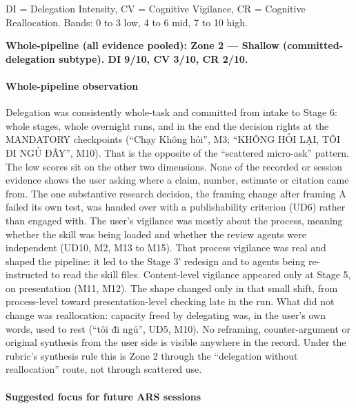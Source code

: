 \documentclass[12pt,a4paper]{article}
\begin{document}
DI = Delegation Intensity, CV = Cognitive Vigilance, CR = Cognitive
Reallocation. Bands: 0 to 3 low, 4 to 6 mid, 7 to 10 high.

\textbf{Whole-pipeline (all evidence pooled): Zone 2 --- Shallow
(committed-delegation subtype). DI 9/10, CV 3/10, CR 2/10.}

\hypertarget{whole-pipeline-observation}{%
\paragraph{Whole-pipeline
observation}\label{whole-pipeline-observation}}

Delegation was consistently whole-task and committed from intake to
Stage 6: whole stages, whole overnight runs, and in the end the decision
rights at the MANDATORY checkpoints (``Chạy Không hỏi'', M3; ``KHÔNG HỎI
LẠI, TÔI ĐI NGỦ ĐÂY'', M10). That is the opposite of the ``scattered
micro-ask'' pattern. The low scores sit on the other two dimensions.
None of the recorded or session evidence shows the user asking where a
claim, number, estimate or citation came from. The one substantive
research decision, the framing change after framing A failed its own
test, was handed over with a publishability criterion (UD6) rather than
engaged with. The user's vigilance was mostly about the process, meaning
whether the skill was being loaded and whether the review agents were
independent (UD10, M2, M13 to M15). That process vigilance was real and
shaped the pipeline: it led to the Stage 3' redesign and to agents being
re-instructed to read the skill files. Content-level vigilance appeared
only at Stage 5, on presentation (M11, M12). The shape changed only in
that small shift, from process-level toward presentation-level checking
late in the run. What did not change was reallocation: capacity freed by
delegating was, in the user's own words, used to rest (``tôi đi ngủ'',
UD5, M10). No reframing, counter-argument or original synthesis from the
user side is visible anywhere in the record. Under the rubric's
synthesis rule this is Zone 2 through the ``delegation without
reallocation'' route, not through scattered use.

\hypertarget{suggested-focus-for-future-ars-sessions}{%
\paragraph{Suggested focus for future ARS
sessions}\label{suggested-focus-for-future-ars-sessions}}
\end{document}
